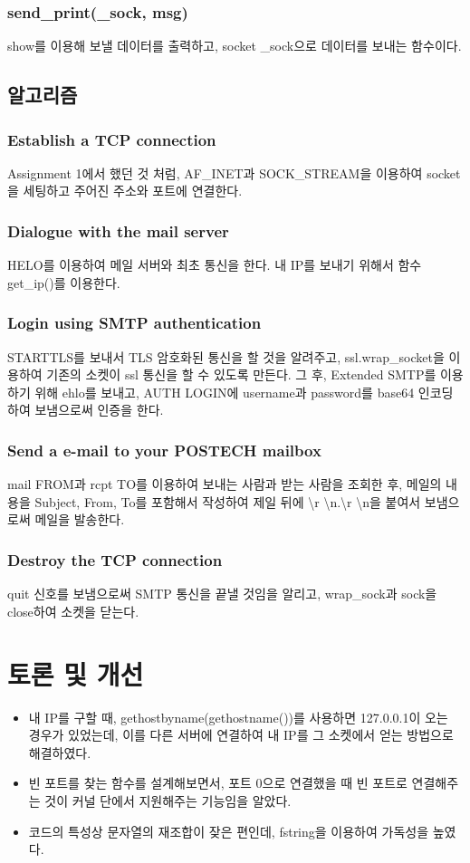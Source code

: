 \documentclass{article}
\begin{document}
    \subsubsection{send\_print(\_sock, msg)}
    show를 이용해 보낼 데이터를 출력하고, socket \_sock으로 데이터를 보내는 함수이다.

    \subsection{알고리즘}
    \subsubsection{Establish a TCP connection}
    Assignment 1에서 했던 것 처럼, AF\_INET과 SOCK\_STREAM을 이용하여 socket을 세팅하고 주어진 주소와 포트에 연결한다.

    \subsubsection{Dialogue with the mail server}
    HELO를 이용하여 메일 서버와 최초 통신을 한다. 내 IP를 보내기 위해서 함수 get\_ip()를 이용한다.

    \subsubsection{Login using SMTP authentication}
    STARTTLS를 보내서 TLS 암호화된 통신을 할 것을 알려주고, ssl.wrap\_socket을 이용하여 기존의 소켓이 ssl 통신을 할 수 있도록 만든다.
    그 후, Extended SMTP를 이용하기 위해 ehlo를 보내고, AUTH LOGIN에 username과 password를 base64 인코딩하여 보냄으로써 인증을 한다.

    \subsubsection{Send a e-mail to your POSTECH mailbox}
    mail FROM과 rcpt TO를 이용하여 보내는 사람과 받는 사람을 조회한 후, 메일의 내용을 Subject, From, To를 포함해서 작성하여 제일 뒤에 \textbackslash r \textbackslash n.\textbackslash r \textbackslash n을 붙여서 보냄으로써 메일을 발송한다.
    \subsubsection{Destroy the TCP connection}
    quit 신호를 보냄으로써 SMTP 통신을 끝낼 것임을 알리고, wrap\_sock과 sock을 close하여 소켓을 닫는다.

    \section{토론 및 개선}
    \begin{itemize}
        \item 내 IP를 구할 때, gethostbyname(gethostname())를 사용하면 127.0.0.1이 오는 경우가 있었는데, 이를 다른 서버에 연결하여 내 IP를 그 소켓에서 얻는 방법으로 해결하였다.
        \item 빈 포트를 찾는 함수를 설계해보면서, 포트 0으로 연결했을 때 빈 포트로 연결해주는 것이 커널 단에서 지원해주는 기능임을 알았다.
        \item 코드의 특성상 문자열의 재조합이 잦은 편인데, fstring을 이용하여 가독성을 높였다.
    \end{itemize}
\end{document}
